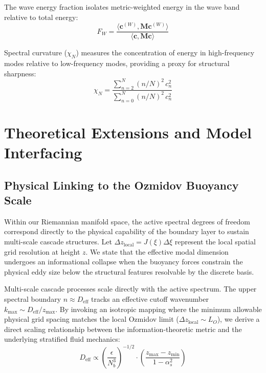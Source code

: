 \documentclass[11pt,a4paper]{article}
\begin{document}
The wave energy fraction isolates metric-weighted energy in the wave band relative to total energy:
\begin{equation}
F_W = \frac{\langle \mathbf{c}^{(W)}, \mathbf{M} \mathbf{c}^{(W)} \rangle}{\langle \mathbf{c}, \mathbf{M} \mathbf{c} \rangle}
\label{eq:f_w}
\end{equation}

Spectral curvature ($\chi_N$) measures the concentration of energy in high-frequency modes relative to low-frequency modes, providing a proxy for structural sharpness:
\begin{equation}
\chi_N = \frac{\sum_{n=2}^{N} (n/N)^2 \, c_n^2}{\sum_{n=0}^{N} (n/N)^2 \, c_n^2}
\label{eq:chi_n}
\end{equation}

\section{Theoretical Extensions and Model Interfacing}
\label{sec:extensions}

\subsection{Physical Linking to the Ozmidov Buoyancy Scale}
\label{sec:extensions:ozmidov}

Within our Riemannian manifold space, the active spectral degrees of freedom correspond directly to the physical capability of the boundary layer to sustain multi-scale cascade structures. Let $\Delta z_{\text{local}} = J(\xi) \Delta \xi$ represent the local spatial grid resolution at height $z$. We state that the effective modal dimension undergoes an informational collapse when the buoyancy forces constrain the physical eddy size below the structural features resolvable by the discrete basis. 

Multi-scale cascade processes scale directly with the active spectrum. The upper spectral boundary $n \approx D_{\mathrm{eff}}$ tracks an effective cutoff wavenumber $k_{\mathrm{max}} \sim D_{\mathrm{eff}} / z_{\max}$. By invoking an isotropic mapping where the minimum allowable physical grid spacing matches the local Ozmidov limit ($\Delta z_{\text{local}} \sim L_O$), we derive a direct scaling relationship between the information-theoretic metric and the underlying stratified fluid mechanics:
\begin{equation}
D_{\mathrm{eff}} \propto \left( \frac{\epsilon}{N_b^3} \right)^{-1/2} \cdot \left( \frac{z_{\max} - z_{\min}}{1 - \alpha_s^2} \right)
\label{eq:d_eff_ozmidov_scaling}
\end{equation}
\end{document}
